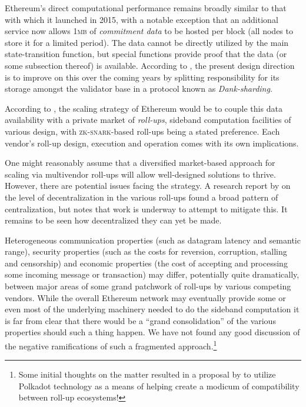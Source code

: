 Ethereum's direct computational performance remains broadly similar to that with which it launched in 2015, with a notable exception that an additional service now allows 1\textsc{mb} of \emph{commitment data} to be hosted per block (all nodes to store it for a limited period). The data cannot be directly utilized by the main state-transition function, but special functions provide proof that the data (or some subsection thereof) is available. According to \cite{ethereum2024danksharding}, the present design direction is to improve on this over the coming years by splitting responsibility for its storage amongst the validator base in a protocol known as \emph{Dank-sharding}.

According to \cite{ethereum2024sigital}, the scaling strategy of Ethereum would be to couple this data availability with a private market of \emph{roll-ups}, sideband computation facilities of various design, with \textsc{zk-snark}-based roll-ups being a stated preference. Each vendor's roll-up design, execution and operation comes with its own implications.

One might reasonably assume that a diversified market-based approach for scaling via multivendor roll-ups will allow well-designed solutions to thrive. However, there are potential issues facing the strategy. A research report by \cite{sharma2024ethereums} on the level of decentralization in the various roll-ups found a broad pattern of centralization, but notes that work is underway to attempt to mitigate this. It remains to be seen how decentralized they can yet be made.

Heterogeneous communication properties (such as datagram latency and semantic range), security properties (such as the costs for reversion, corruption, stalling and censorship) and economic properties (the cost of accepting and processing some incoming message or transaction) may differ, potentially quite dramatically, between major areas of some grand patchwork of roll-ups by various competing vendors. While the overall Ethereum network may eventually provide some or even most of the underlying machinery needed to do the sideband computation it is far from clear that there would be a ``grand consolidation'' of the various properties should such a thing happen. We have not found any good discussion of the negative ramifications of such a fragmented approach.\footnote{Some initial thoughts on the matter resulted in a proposal by \cite{sadana2024bringing} to utilize Polkadot technology as a means of helping create a modicum of compatibility between roll-up ecosystems!}

